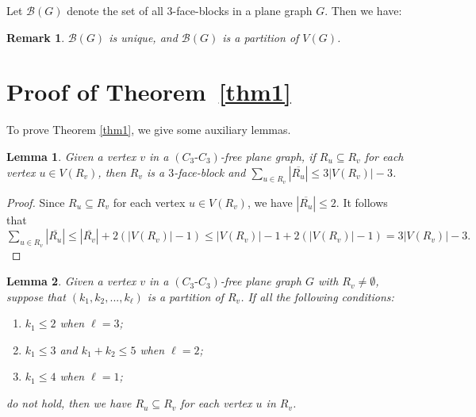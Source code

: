 \documentclass[12pt]{article}
\newtheorem{lemma}{Lemma}[section]
\newtheorem{rem}{Remark}[section]
\begin{document}
Let $\mathcal{B}(G)$ denote the set of all $3$-face-blocks in a plane graph $G$. Then we have:

\begin{rem}
     $\mathcal{B}(G)$ is unique, and $\mathcal{B}(G)$ is a partition of $V(G)$.
\end{rem}


\section{Proof of Theorem~\ref{thm1}}

To prove Theorem \ref{thm1}, we give some auxiliary lemmas.

\begin{lemma}\label{R-v}
    Given a vertex $v$ in a $(C_3\text{-}C_3)$-free plane graph, if $R_u\subseteq R_v$ for each vertex $u\in V(R_v)$, then $R_v$ is a $3$-face-block and $\sum_{u \in R_v}|\overline{R_u}| \leq 3|V(R_v)|-3$.
\end{lemma}

\begin{proof}
    Since $R_u\subseteq R_v$ for each vertex $u\in V(R_v)$, we have $|\overline{R_u}| \leq 2$. 
    It follows that
    $\sum_{u \in R_v}|\overline{R_u}| \leq |\overline{R_v}|+2(|V(R_v)|-1)\leq |V(R_v)|-1+2(|V(R_v)|-1)=3|V(R_v)|-3.$
\end{proof}

\begin{lemma}\label{partition}
    Given a vertex $v$ in a $(C_3\text{-}C_3)$-free plane graph $G$ with $R_v\neq\emptyset$, suppose that $(k_1,k_2,...,k_{\ell})$ is a partition of $R_v$. If all the following conditions: 
    \begin{enumerate}
        \item $k_1\leq 2$ when $\ell=3$;
        \item $k_1\leq 3$ and $k_1+k_2\leq 5$ when $\ell=2$;
        \item $k_1\leq 4$ when $\ell=1$;
    \end{enumerate} 
    do not hold, then we have $R_u \subseteq R_v$ for each vertex $u$ in $R_v$.
\end{lemma}
\end{document}
